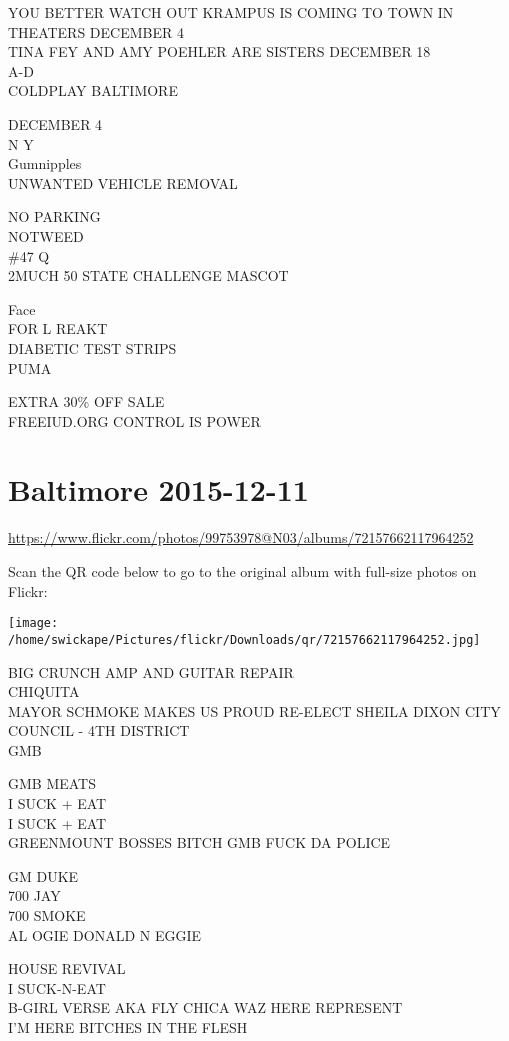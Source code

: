 \documentclass[10pt,letterpaper]{article}
\begin{document}
YOU BETTER WATCH OUT KRAMPUS IS COMING TO TOWN IN THEATERS DECEMBER 4\\
TINA FEY AND AMY POEHLER ARE SISTERS DECEMBER 18\\
A{-}D\\
COLDPLAY BALTIMORE

DECEMBER 4\\
N Y\\
Gumnipples\\
UNWANTED VEHICLE REMOVAL

NO PARKING\\
NOTWEED\\
\#47 Q\\
2MUCH 50 STATE CHALLENGE MASCOT

Face\\
FOR L REAKT\\
DIABETIC TEST STRIPS\\
PUMA

EXTRA 30\% OFF SALE\\
FREEIUD.ORG CONTROL IS POWER


\section*{Baltimore 2015-12-11}

\url{https://www.flickr.com/photos/99753978@N03/albums/72157662117964252}

Scan the QR code below to go to the original album with full-size photos on Flickr:

\texttt{[image: /home/swickape/Pictures/flickr/Downloads/qr/72157662117964252.jpg]}


BIG CRUNCH AMP AND GUITAR REPAIR\\
CHIQUITA\\
MAYOR SCHMOKE MAKES US PROUD RE{-}ELECT SHEILA DIXON CITY COUNCIL {-} 4TH DISTRICT\\
GMB

GMB MEATS\\
I SUCK + EAT\\
I SUCK + EAT\\
GREENMOUNT BOSSES BITCH GMB FUCK DA POLICE

GM DUKE\\
700 JAY\\
700 SMOKE\\
AL OGIE DONALD N EGGIE

HOUSE REVIVAL\\
I SUCK{-}N{-}EAT\\
B{-}GIRL VERSE AKA FLY CHICA WAZ HERE REPRESENT\\
I'M HERE BITCHES IN THE FLESH
\end{document}
